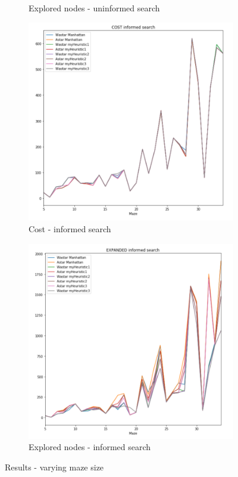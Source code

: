 \documentclass[a4paper,12pt]{report}
\begin{document}
\begin{figure}[h!]
\begin{subfigure}[b]{0.45\linewidth}
    \caption{Explored nodes - uninformed search}
  \end{subfigure}
 \begin{subfigure}[b]{0.45\linewidth}
    \includegraphics[width=\linewidth]{pictures/variedMazeSize/5.png}
    \caption{Cost - informed search}
  \end{subfigure}
  \begin{subfigure}[b]{0.45\linewidth}
    \includegraphics[width=\linewidth]{pictures/variedMazeSize/6.png}
    \caption{Explored nodes - informed search}
  \end{subfigure}
  \caption{Results - varying maze size}
  \label{fig:pic5}
\end{figure}
\vspace{0.5cm}
\end{document}
